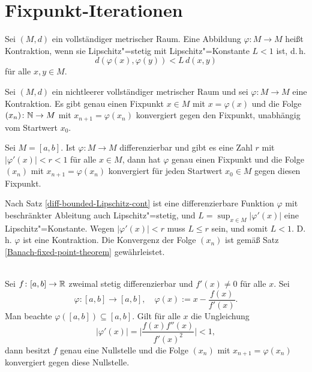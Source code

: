 \newpage
\section{Fixpunkt-Iterationen}%

\begin{Definition}[Kontraktion]
Sei $(M,d)$ ein vollständiger metrischer Raum. Eine Abbildung
$\varphi\colon M\to M$ heißt Kontraktion, wenn sie
Lipschitz"=stetig mit Lipschitz"=Konstante $L<1$ ist, d.\,h.
\[d(\varphi(x),\varphi(y))<L\,d(x,y)\]
für alle $x,y\in M$.
\end{Definition}

\begin{Satz}\label{Banach-fixed-point-theorem}%
Sei $(M,d)$ ein nichtleerer vollständiger metrischer Raum
und sei $\varphi\colon M\to M$ eine Kontraktion. Es gibt genau
einen Fixpunkt $x\in M$ mit $x=\varphi(x)$ und die Folge
$(x_n)\colon\mathbb N\to M$ mit $x_{n+1}=\varphi(x_n)$ konvergiert
gegen den Fixpunkt, unabhängig vom Startwert $x_0$.
\end{Satz}

\begin{Satz}\label{diff-fixed-point-iter}
Sei $M=[a,b]$. Ist $\varphi\colon M\to M$ differenzierbar und gibt es
eine Zahl $r$ mit $|\varphi'(x)|<r<1$ für alle $x\in M$, dann
hat $\varphi$ genau einen Fixpunkt und die Folge $(x_n)$ mit $x_{n+1}=\varphi(x_n)$
konvergiert für jeden Startwert $x_0\in M$ gegen diesen Fixpunkt.
\end{Satz}
\begin{Beweis}
Nach Satz \ref{diff-bounded-Lipschitz-cont} ist eine differenzierbare
Funktion $\varphi$ mit beschränkter Ableitung auch Lipschitz"=stetig,
und $L=\sup_{x\in M}|\varphi'(x)|$ eine Lipschitz"=Konstante.
Wegen $|\varphi'(x)|<r$ muss $L\le r$ sein, und somit $L<1$.
D.\,h. $\varphi$ ist eine Kontraktion. Die Konvergenz der Folge
$(x_n)$ ist gemäß Satz \ref{Banach-fixed-point-theorem}
gewährleistet.\;\qedsymbol
\end{Beweis}

\begin{Satz}%
\mbox{}\\
Sei $f\colon [a,b]\to\mathbb R$ zweimal stetig differenzierbar und
$f'(x)\ne 0$ für alle $x$. Sei%
\[\varphi\colon [a,b]\to [a,b],\quad \varphi(x):=x-\frac{f(x)}{f'(x)}.\]
Man beachte $\varphi([a,b])\subseteq [a,b]$. Gilt für alle $x$ die Ungleichung%
\[|\varphi'(x)| = \bigg|\frac{f(x)f''(x)}{f'(x)^2}\bigg| < 1,\]
dann besitzt $f$ genau eine Nullstelle und die Folge $(x_n)$ mit
$x_{n+1}=\varphi(x_n)$ konvergiert gegen diese Nullstelle.
\end{Satz}


